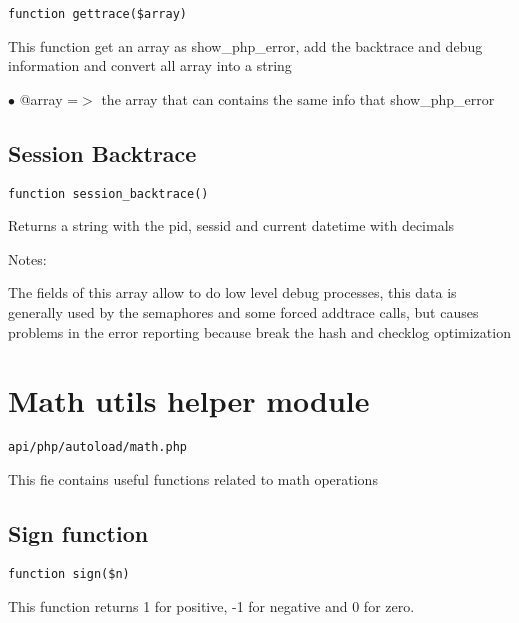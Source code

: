 \documentclass[a4paper]{book}
\begin{document}
\begin{lstlisting}
function gettrace($array)
\end{lstlisting}

This function get an array as show\_php\_error, add the backtrace and debug
information and convert all array into a string

\begin{compactitem}
\item[\color{myblue}$\bullet$] @array =$>$ the array that can contains the same info that show\_php\_error
\end{compactitem}

\hypertarget{toc197}{}
\subsection{Session Backtrace}

\begin{lstlisting}
function session_backtrace()
\end{lstlisting}

Returns a string with the pid, sessid and current datetime with decimals

Notes:

The fields of this array allow to do low level debug processes, this data is
generally used by the semaphores and some forced addtrace calls, but causes
problems in the error reporting because break the hash and checklog optimization

\hypertarget{toc198}{}
\section{Math utils helper module}

\begin{lstlisting}
api/php/autoload/math.php
\end{lstlisting}

This fie contains useful functions related to math operations

\hypertarget{toc199}{}
\subsection{Sign function}

\begin{lstlisting}
function sign($n)
\end{lstlisting}

This function returns 1 for positive, -1 for negative and 0 for zero.
\end{document}
